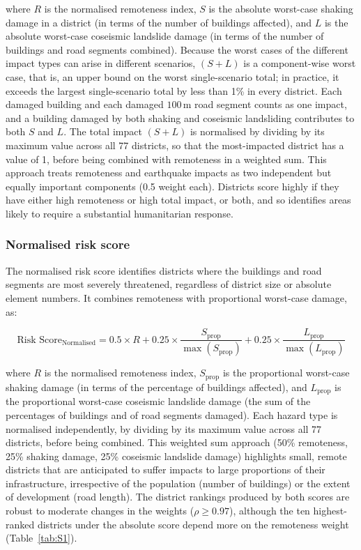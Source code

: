 \documentclass[preprint,12pt,authoryear]{elsarticle}
\begin{document}
where $R$ is the normalised remoteness index, $S$ is the absolute worst-case shaking damage in a district (in terms of the number of buildings affected), and $L$ is the absolute worst-case coseismic landslide damage (in terms of the number of buildings and road segments combined). Because the worst cases of the different impact types can arise in different scenarios, $(S + L)$ is a component-wise worst case, that is, an upper bound on the worst single-scenario total; in practice, it exceeds the largest single-scenario total by less than 1\% in every district. Each damaged building and each damaged $100\,\text{m}$ road segment counts as one impact, and a building damaged by both shaking and coseismic landsliding contributes to both $S$ and $L$. The total impact $(S + L)$ is normalised by dividing by its maximum value across all 77 districts, so that the most-impacted district has a value of 1, before being combined with remoteness in a weighted sum. This approach treats remoteness and earthquake impacts as two independent but equally important components (0.5 weight each). Districts score highly if they have either high remoteness or high total impact, or both, and so identifies areas likely to require a substantial humanitarian response.

\subsubsection{Normalised risk score}

The normalised risk score identifies districts where the buildings and road segments are most severely threatened, regardless of district size or absolute element numbers. It combines remoteness with proportional worst-case damage, as:

\begin{equation}
\label{eq:normalized-risk-score}
\text{Risk Score}_{\text{Normalised}} = 0.5 \times R + 0.25 \times \frac{S_{\text{prop}}}{\max(S_{\text{prop}})} + 0.25 \times \frac{L_{\text{prop}}}{\max(L_{\text{prop}})}
\end{equation}

where $R$ is the normalised remoteness index, $S_{\text{prop}}$ is the proportional worst-case shaking damage (in terms of the percentage of buildings affected), and $L_{\text{prop}}$ is the proportional worst-case coseismic landslide damage (the sum of the percentages of buildings and of road segments damaged). Each hazard type is normalised independently, by dividing by its maximum value across all 77 districts, before being combined. This weighted sum approach (50\% remoteness, 25\% shaking damage, 25\% coseismic landslide damage) highlights small, remote districts that are anticipated to suffer impacts to large proportions of their infrastructure, irrespective of the population (number of buildings) or the extent of development (road length). The district rankings produced by both scores are robust to moderate changes in the weights ($\rho \geq 0.97$), although the ten highest-ranked districts under the absolute score depend more on the remoteness weight (Table~\ref{tab:S1}).
\end{document}
